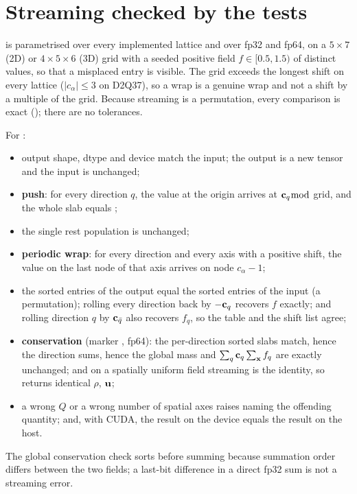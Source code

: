 \section{Streaming checked by the tests}

 is parametrised over every implemented lattice and over
fp32 and fp64, on a $5\times7$ (2D) or $4\times5\times6$ (3D) grid with a seeded positive
field $f \in [0.5, 1.5)$ of distinct values, so that a misplaced entry is visible. The grid
exceeds the longest shift on every lattice ($|c_\alpha| \le 3$ on D2Q37), so a wrap is a
genuine wrap and not a shift by a multiple of the grid. Because streaming is a permutation,
every comparison is exact (); there are no tolerances.

For :
\begin{itemize}[nosep]
\item output shape, dtype and device match the input; the output is a new tensor and the
      input is unchanged;
\item \textbf{push}: for every direction $q$, the value at the origin arrives at
      $\mathbf{c}_q \bmod$ grid, and the whole slab equals ;
\item the single rest population is unchanged;
\item \textbf{periodic wrap}: for every direction and every axis with a positive shift, the
      value on the last node of that axis arrives on node $c_\alpha - 1$;
\item the sorted entries of the output equal the sorted entries of the input (a
      permutation); rolling every direction back by $-\mathbf{c}_q$ recovers $f$ exactly; and
      rolling direction $q$ by $\mathbf{c}_{\bar{q}}$ also recovers $f_q$, so the  table
      and the shift list agree;
\item \textbf{conservation} (marker , fp64): the per-direction sorted
      slabs match, hence the direction sums, hence the global mass and
      $\sum_q \mathbf{c}_q \sum_{\mathbf{x}} f_q$ are exactly unchanged; and on a spatially uniform
      field streaming is the identity, so  returns identical $\rho$, $\mathbf{u}$;
\item a wrong $Q$ or a wrong number of spatial axes raises  naming the
      offending quantity; and, with CUDA, the result on the device equals the result on the
      host.
\end{itemize}
The global conservation check sorts before summing because summation order differs between
the two fields; a last-bit difference in a direct fp32 sum is not a streaming error.

